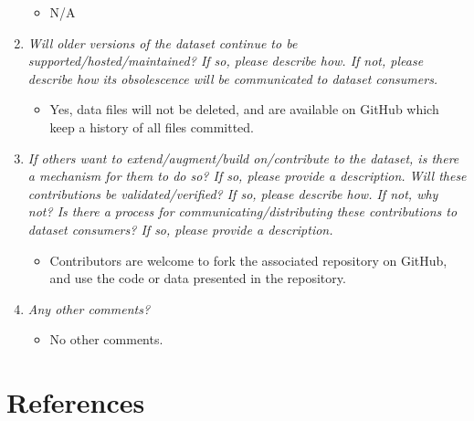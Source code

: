 \documentclass[
]{article}
\providecommand{\tightlist}{%
  \setlength{\itemsep}{0pt}\setlength{\parskip}{0pt}}
\begin{document}
\begin{enumerate}
  \begin{itemize}
  \tightlist
  \item
    N/A
  \end{itemize}
\item
  \emph{Will older versions of the dataset continue to be supported/hosted/maintained? If so, please describe how. If not, please describe how its obsolescence will be communicated to dataset consumers.}

  \begin{itemize}
  \tightlist
  \item
    Yes, data files will not be deleted, and are available on GitHub which keep a history of all files committed.
  \end{itemize}
\item
  \emph{If others want to extend/augment/build on/contribute to the dataset, is there a mechanism for them to do so? If so, please provide a description. Will these contributions be validated/verified? If so, please describe how. If not, why not? Is there a process for communicating/distributing these contributions to dataset consumers? If so, please provide a description.}

  \begin{itemize}
  \tightlist
  \item
    Contributors are welcome to fork the associated repository on GitHub, and use the code or data presented in the repository.
  \end{itemize}
\item
  \emph{Any other comments?}

  \begin{itemize}
  \tightlist
  \item
    No other comments.
  \end{itemize}
\end{enumerate}

\newpage

\hypertarget{references}{%
\section*{References}\label{references}}
\end{document}
